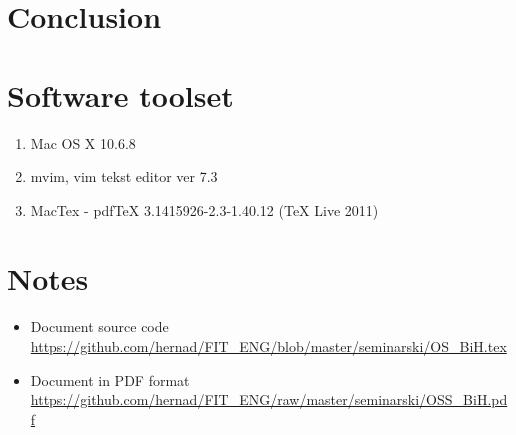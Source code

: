 \documentclass[times, utf8, seminar]{fit}
\begin{document}
\chapter{Conclusion}




\appendix

\chapter{Software toolset}
\begin{enumerate}
  \item Mac OS X 10.6.8
  \item mvim, vim tekst editor ver 7.3
  \item MacTex - pdfTeX 3.1415926-2.3-1.40.12 (TeX Live 2011)
\end{enumerate}

\chapter{Notes}

\begin{itemize}
  \item Document source code \url{https://github.com/hernad/FIT_ENG/blob/master/seminarski/OS_BiH.tex}
  \item Document in PDF format \url{https://github.com/hernad/FIT_ENG/raw/master/seminarski/OSS_BiH.pdf}
\end{itemize}
\end{document}
